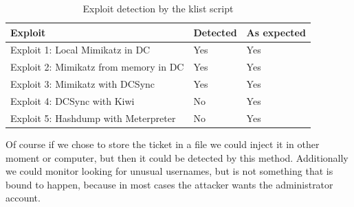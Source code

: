 \begin{table}[H]
	\centering
	\begin{tabular}{|l|l|l|}
		\hline
		\rowcolor{gray!30}
		Exploit & Detected & As expected \\ \hline
		Exploit 1: Local Mimikatz in DC& \cellcolor{green!60}Yes& \cellcolor{green!60}Yes\\ \hline
		Exploit 2: Mimikatz from memory in DC& \cellcolor{green!60}Yes& \cellcolor{green!60}Yes\\ \hline
		Exploit 3: Mimikatz with DCSync& \cellcolor{green!60}Yes& \cellcolor{green!60}Yes\\ \hline
		Exploit 4: DCSync with Kiwi& \cellcolor{red!60}No& \cellcolor{green!60}Yes\\ \hline
		Exploit 5: Hashdump with Meterpreter& \cellcolor{red!60}No& \cellcolor{green!60}Yes\\ \hline
	\end{tabular}
	\caption{Exploit detection by the klist script}
\end{table}
Of course if we chose to store the ticket in a file we could inject it in other moment or computer, but then it could be detected by this method.
\linej
\linej
Additionally we could monitor looking for unusual usernames, but is not something that is bound to happen, because in most cases the attacker wants the administrator account.

